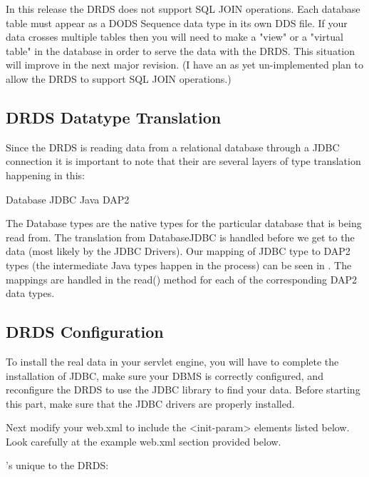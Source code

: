 \documentclass{dods-book}
\begin{document}
In this release the DRDS does not support SQL JOIN operations. Each database 
table must appear as a DODS Sequence data type in its own DDS file. If your 
data crosses multiple tables then you will need to make a "view" or a "virtual table" 
in the database in order to serve the data with the DRDS. This situation will improve 
in the next major revision. (I have an as yet un-implemented plan to allow the DRDS 
to support SQL JOIN operations.)


\subsection{DRDS Datatype Translation}
Since the DRDS is reading data from a relational database through a JDBC connection 
it is important to note	that their are several layers of type translation happening in this:

Database \lit{->} JDBC \lit{->} Java \lit{->} DAP2

The Database types are the native types for the particular database that is being read from. 
The translation from Database\lit{->}JDBC is handled before we get to the data (most likely 
by the JDBC Drivers). Our mapping of JDBC type to DAP2 types (the intermediate Java 
types happen in the process) can be seen in  . The mappings
are handled in the read() method for each of the corresponding DAP2 data types.



\subsection{DRDS Configuration}


To install the real data in your servlet engine, you will have to complete the installation 
of JDBC, make sure your DBMS is correctly configured, and reconfigure the DRDS 
to use the JDBC library to find your data. Before starting this part, make sure that the 
JDBC drivers are properly installed.

Next modify your web.xml to include the <init-param> elements listed below. Look 
carefully at the example web.xml section provided below.

's unique to the DRDS:
\end{document}
